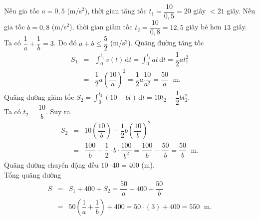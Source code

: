 \begin{ex}
{		\begin{itemchoice}
			\itemch  Nếu gia tốc $a=0{,}5$ (m/s$^2$), thời gian tăng tốc $t_1 = \dfrac{10}{0,5} = 20$ giây $< 21$ giây.
			\itemch Nếu gia tốc $b = 0{,}8$ (m/s$^2$), thời gian giảm tốc $t_2 =  \dfrac{10}{0{,}8} = 12{,}5$ giây bé hơn $13$ giây.
			\itemch 
			Ta có $\dfrac{1}{a}+\dfrac{1}{b}=3$. Do đó $a+b \le \dfrac{5}{2}$  (m/s$^2$).
			 \itemch Quãng đường tăng tốc
			\allowdisplaybreaks 
			\begin{eqnarray*}
				S_1  &=& \displaystyle\int_0^{t_1}v(t)\mathrm{\,d}t =\displaystyle\int_0^{t_1}at\mathrm{\,d}t =\dfrac{1}{2}at_1^2\\
				&=&\dfrac{1}{2}a\left(\dfrac{10}{a}\right)^2=\dfrac{1}{2}a\dfrac{10}{a^2}=\dfrac{50}{a}\;\text{  m}.
			\end{eqnarray*}
			\noindent Quãng đường  giảm tốc
			$ S_2 = \displaystyle\int_0^{t_2} (10-bt)\mathrm{\,d}t  = 10t_2-\dfrac{1}{2}bt_2^2$.\\
			Ta có $t_2 = \dfrac{10}{b}.$  Suy ra
			 \allowdisplaybreaks
			\begin{eqnarray*}
				S_2&=&  10\left(\dfrac{10}{b}\right)-\dfrac{1}{2}b\left(\dfrac{10}{b}\right)^2\\
				&=&  \dfrac{100}{b}-\dfrac{1}{2}\cdot b \cdot\dfrac{100}{b^2}=\dfrac{100}{b}-\dfrac{50}{b} = \dfrac{50}{b}\; \text{ m}.
			\end{eqnarray*}
			Quãng đường chuyển động đều $10 \cdot  40 = 400$ (m).\\
			 Tổng quãng đường
			\allowdisplaybreaks 
			\begin{eqnarray*}
				 S&=& S_1 + 400 + S_2= \dfrac{50}{a} + 400 + \dfrac{50}{b}\\
				& =&  50\left(\dfrac{1}{a}+\dfrac{1}{b}\right) + 400=50\cdot(3) + 400=550\;\text{ m}.
			\end{eqnarray*}
	\end{itemchoice}}
\end{ex}

